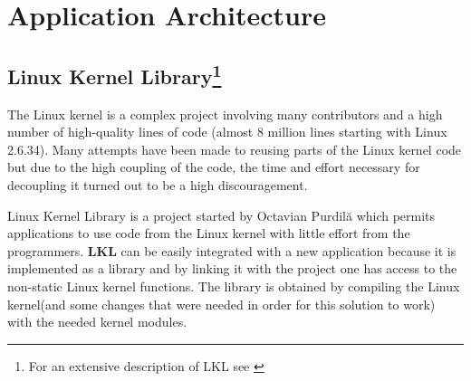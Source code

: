 \chapter{Application Architecture}
\label{chapter:arch}

\section[Linux Kernel Library]{Linux Kernel Library\footnote{For an extensive description of LKL see \cite{thesis}}}
\label{sec:lkl}

The Linux kernel is a complex project involving many contributors and a high number of high-quality lines 
of code (almost 8 million lines starting with Linux 2.6.34). Many attempts have been made to reusing parts of 
the Linux kernel code but due to the high coupling of the code, the time and effort necessary for decoupling 
it turned out to be a high discouragement. 

Linux Kernel Library is a project started by Octavian Purdil\u{a} which permits applications to use code from 
the Linux kernel with little effort from the programmers. \textbf{LKL} can be easily integrated with a new 
application because it is implemented as a library and by linking it with the project one has access to the 
non-static Linux kernel functions. The library is obtained by compiling the Linux kernel(and some changes that 
were needed in order for this solution to work) with the needed kernel modules. 

